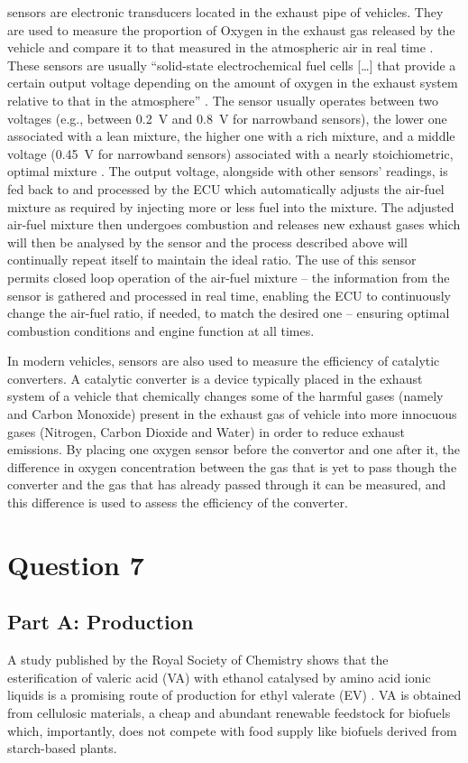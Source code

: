 \documentclass[11pt]{article}
\begin{document}
 sensors are electronic transducers located in the exhaust pipe of vehicles. They are used to measure the proportion of Oxygen in the exhaust gas released by the vehicle and compare it to that measured in the atmospheric air in real time \cite{q6-r4}. These sensors are usually “solid-state electrochemical fuel cells […] that provide a certain output voltage depending on the amount of oxygen in the exhaust system relative to that in the atmosphere” \cite{q6-r4}. The sensor usually operates between two voltages (e.g., between \SI{0.2}{\volt} and \SI{0.8}{\volt} for narrowband sensors), the lower one associated with a lean mixture, the higher one with a rich mixture, and a middle voltage (\SI{0.45}{\volt} for narrowband sensors) associated with a nearly stoichiometric, optimal mixture \cite{q6-r4}. The output voltage, alongside with other sensors’ readings, is fed back to and processed by the ECU which automatically adjusts the air-fuel mixture as required by injecting more or less fuel into the mixture. The adjusted air-fuel mixture then undergoes combustion and releases new exhaust gases which will then be analysed by the  sensor and the process described above will continually repeat itself to maintain the ideal ratio. The use of this sensor permits closed loop operation of the air-fuel mixture – the information from the sensor is gathered and processed in real time, enabling the ECU to continuously change the air-fuel ratio, if needed, to match the desired one – ensuring optimal combustion conditions and engine function at all times.

In modern vehicles,  sensors are also used to measure the efficiency of catalytic converters. A catalytic converter is a device typically placed in the exhaust system of a vehicle that chemically changes some of the harmful gases (namely  and Carbon Monoxide) present in the exhaust gas of vehicle into more innocuous gases (Nitrogen, Carbon Dioxide and Water) in order to reduce exhaust emissions. By placing one oxygen sensor before the convertor and one after it, the difference in oxygen concentration between the gas that is yet to pass though the converter and the gas that has already passed through it can be measured, and this difference is used to assess the efficiency of the converter.
\section{Question 7}
\subsection*{Part A: Production}
A study published by the Royal Society of Chemistry shows that the esterification of valeric acid (VA) with ethanol catalysed by amino acid ionic liquids is a promising route of production for ethyl valerate (EV) \cite{q7-r1}. VA is obtained from cellulosic materials, a cheap and abundant renewable feedstock for biofuels which, importantly, does not compete with food supply like biofuels derived from starch-based plants.
\end{document}
